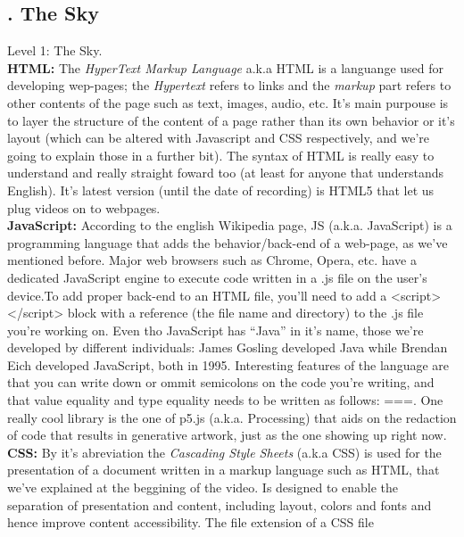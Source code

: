 \documentclass[letterpaper, 12pt]{article}
\begin{document}
\subsection*{{. The Sky}} \justify
Level 1: The Sky.
\\\newline
\textbf{HTML:} The \emph{HyperText Markup Language} a.k.a HTML is a languange used for developing wep-pages; the \emph{Hypertext} refers to links and the \emph{markup} part refers to other contents of the page such as text, images, audio, etc. It's main purpouse is to layer the
structure of the content of a page rather than its own behavior or it's layout (which can be altered with Javascript and CSS respectively, and we're going to explain those in a further bit). The syntax of HTML is really easy to understand and really straight foward too (at least for anyone that understands English). 
It's latest version (until the date of recording) is HTML5 that let us plug videos on to webpages.
\\\newline
\textbf{JavaScript:} According to the english Wikipedia page, JS (a.k.a. JavaScript) is a programming language that adds the behavior/back-end of a web-page, as we've mentioned before. Major web browsers such as Chrome, Opera, etc. have a dedicated JavaScript engine to execute code written in a .js file on the user's device.To add proper back-end to an HTML file, you'll need to 
add a <script></script> block with a reference (the file name and directory) to the .js file you're working on. Even tho JavaScript has ``Java'' in it's name, those we're developed by different individuals: James Gosling developed Java while Brendan Eich developed JavaScript, both in 1995. Interesting features of the language are that you can
write down or ommit semicolons on the code you're writing, and that value equality and type equality needs to be written as follows: ===. One really cool library is the one of p5.js (a.k.a. Processing) that aids on the redaction of code that results in generative artwork, just as the one showing up right now. 
\\\newline
\textbf{CSS:} By it's abreviation the \emph{Cascading Style Sheets} (a.k.a CSS) is used for the presentation of a document written in a markup language such as HTML, that we've explained at the beggining of the video. Is designed to enable the separation of presentation and content, including layout, colors and fonts and hence improve content accessibility. The file extension of a CSS file
\end{document}
